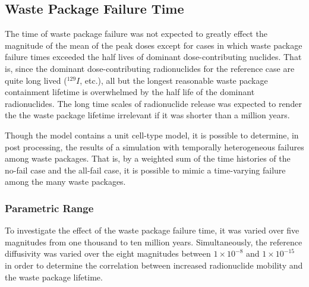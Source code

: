 
\subsection{Waste Package Failure Time}
\label{sec:wpfail}

The time of waste package failure was not expected to greatly effect the 
magnitude of the mean of the peak doses except for cases in which waste package failure times 
exceeded the half lives of dominant dose-contributing nuclides. 
That is, since the dominant dose-contributing 
radionuclides for the reference case are quite long lived ($^{129}I$, etc.), 
all but the longest reasonable waste package containment lifetime is overwhelmed by 
the half life of the dominant radionuclides. The long time scales of 
radionuclide release was expected to render the the waste package lifetime 
irrelevant if it was shorter than a million years. 

Though the model contains a unit cell-type model, it is possible to determine, 
in post processing, the results of a simulation with temporally heterogeneous 
failures among waste packages. That is, by a weighted sum of the time histories 
of the no-fail case and the all-fail case, it is possible to mimic a 
time-varying failure among the many waste packages. 

\subsubsection{Parametric Range}

To investigate the effect of the waste package failure time, it was varied over 
five magnitudes from one thousand to ten million years. Simultaneously, the reference 
diffusivity was varied over the eight magnitudes between $1\times10^{-8}$ and 
$1\times10^{-15}$ in order to determine the correlation between increased 
radionuclide mobility and the waste package lifetime. 

